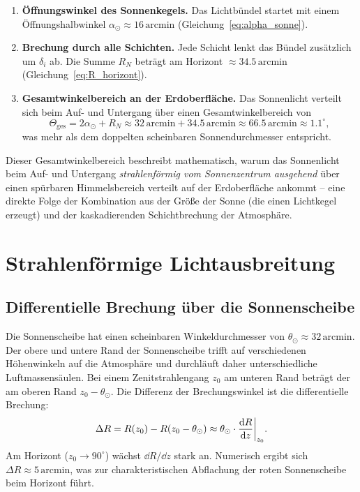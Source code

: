 \documentclass[12pt,a4paper]{article}
\providecommand{\ang}[1]{\ensuremath{#1\,\mathrm{arcmin}}}
\begin{document}
\begin{enumerate}
  \item \textbf{Öffnungswinkel des Sonnenkegels.}
        Das Lichtbündel startet mit einem Öffnungshalbwinkel
        $\alpha_\odot \approx \ang{16}$ (Gleichung~\ref{eq:alpha_sonne}).

  \item \textbf{Brechung durch alle Schichten.}
        Jede Schicht lenkt das Bündel zusätzlich um $\delta_i$ ab.
        Die Summe $R_N$ beträgt am Horizont $\approx\ang{34.5}$
        (Gleichung~\ref{eq:R_horizont}).

  \item \textbf{Gesamtwinkelbereich an der Erdoberfläche.}
        Das Sonnenlicht verteilt sich beim Auf- und Untergang über
        einen Gesamtwinkelbereich von
        \begin{equation}
          \Theta_{\mathrm{ges}} = 2\alpha_\odot + R_N
                                \approx \ang{32}
                                        + \ang{34.5}
                                \approx \ang{66.5}
                                \approx 1.1^{\circ},
          \label{eq:theta_ges}
        \end{equation}
        was mehr als dem doppelten scheinbaren Sonnendurchmesser
        entspricht.
\end{enumerate}

Dieser Gesamtwinkelbereich beschreibt mathematisch,
warum das Sonnenlicht beim Auf- und Untergang
\emph{strahlenförmig vom Sonnenzentrum ausgehend}
über einen spürbaren Himmelsbereich verteilt auf der Erdoberfläche
ankommt -- eine direkte Folge der Kombination aus der Größe der
Sonne (die einen Lichtkegel erzeugt) und der kaskadierenden
Schichtbrechung der Atmosphäre.

\section{Strahlenförmige Lichtausbreitung}
\label{sec:faecher}

\subsection{Differentielle Brechung über die Sonnenscheibe}

Die Sonnenscheibe hat einen scheinbaren Winkeldurchmesser von
$\theta_\odot \approx \ang{32}$.
Der obere und untere Rand der Sonnenscheibe trifft auf
verschiedenen Höhenwinkeln auf die Atmosphäre und durchläuft
daher unterschiedliche Luftmassensäulen.
Bei einem Zenitstrahlengang $z_0$ am unteren Rand beträgt der
am oberen Rand $z_0 - \theta_\odot$.
Die Differenz der Brechungswinkel ist die differentielle Brechung:
\begin{equation}
  \Delta R = R(z_0) - R(z_0 - \theta_\odot)
           \approx \theta_\odot \cdot \dv{R}{z}\bigg|_{z_0}.
  \label{eq:delta_R}
\end{equation}
Am Horizont ($ z_0 \to 90^{\circ}$) wächst $\dd R / \dd z$ stark an.
Numerisch ergibt sich $\Delta R \approx \ang{5}$,
was zur charakteristischen Abflachung der roten Sonnenscheibe
beim Horizont führt.
\end{document}
